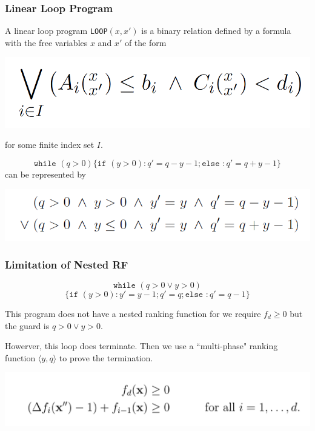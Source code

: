 \documentclass[11pt]{beamer}
\begin{document}
\begin{frame}\frametitle{Linear Loop Program}
\begin{definition}
A linear loop program \texttt{LOOP}$(x, x')$ is a binary relation defined by a formula with the free variables $x$ and $x'$ of the form
\begin{center}
\includegraphics[scale = 0.2]{15.PNG}

\end{center}
for some finite index set $I$.
\end{definition}
\begin{example}
\[\texttt{while } (q > 0)\{\texttt{if } (y > 0): q' = q - y - 1; \texttt{else }: q' = q + y - 1\}\]
can be represented by 
\begin{center}

\includegraphics[scale = 0.35]{17.PNG}
\end{center}
\end{example}
\end{frame}
\begin{frame}\frametitle{Limitation of Nested RF}
\begin{example}
\[\texttt{while }(q > 0 \vee y > 0) \]
\[\{\texttt{if }(y > 0): y' = y - 1; q ' = q;\texttt{else }: q' = q - 1\}\]
\end{example}
This program does not have a nested ranking function for we require $f_d\ge 0$ but the guard is $q > 0 \vee y > 0$.

Howerver, this loop does terminate. Then we use a ``multi-phase" ranking function $\langle y,  q\rangle$ to prove the termination.


\includegraphics[scale = 0.35]{6.PNG}
\end{frame}
\end{document}
